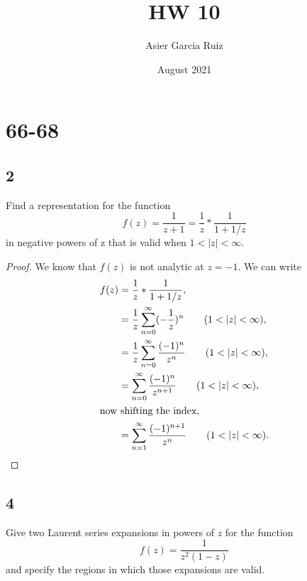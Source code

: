 \documentclass{article}
\title{HW 10}
\author{Asier Garcia Ruiz }
\date{August 2021}
\begin{document}
\maketitle

\section*{66-68}
\subsection*{2}
Find a representation for the function
\[f(z)=\frac{1}{z + 1}= \frac{1}{z}*\frac{1}{1+1/z}\]
in negative powers of z that is valid when $1 < |z| < \infty$.

\begin{proof}
    We know that $f(z)$ is not analytic at $z=-1$. We can write
    \begin{align*}
        f(z) & = \frac{1}{z}*\frac{1}{1+1/z},                                            \\
             & = \frac{1}{z} \sum_{n=0}^\infty (-\frac{1}{z})^n \qquad (1<|z|<\infty),   \\
             & = \frac{1}{z} \sum_{n=0}^\infty \frac{(-1)^n}{z^n} \qquad (1<|z|<\infty), \\
             & = \sum_{n=0}^\infty \frac{(-1)^{n}}{z^{n+1}} \qquad (1<|z|<\infty),       \\
        \intertext{now shifting the index,}
             & = \sum_{n=1}^\infty \frac{(-1)^{n+1}}{z^n} \qquad (1<|z|<\infty).         \\
    \end{align*}
\end{proof}

\subsection*{4}
Give two Laurent series expansions in powers of $z$ for the function
\[f(z) = \frac{1}{z^2(1-z)}\]
and specify the regions in which those expansions are valid.
\end{document}
